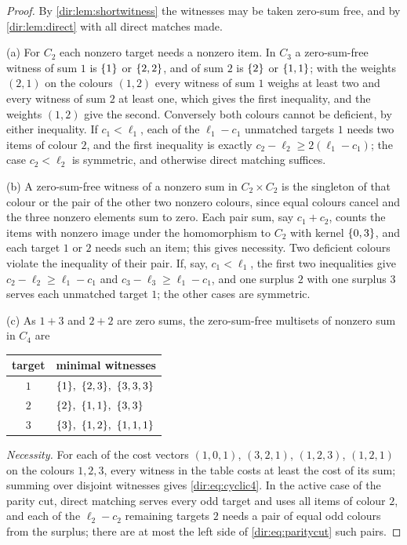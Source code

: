 \begin{proof}
By \cref{dir:lem:shortwitness} the witnesses may be taken zero-sum free, and by \cref{dir:lem:direct} with
all direct matches made.

(a) For $C_2$ each nonzero target needs a nonzero item. In $C_3$ a zero-sum-free witness of sum $1$ is
$\{1\}$ or $\{2,2\}$, and of sum $2$ is $\{2\}$ or $\{1,1\}$; with the weights $(2,1)$ on the colours
$(1,2)$ every witness of sum $1$ weighs at least two and every witness of sum $2$ at least one, which gives
the first inequality, and the weights $(1,2)$ give the second. Conversely both colours cannot be deficient,
by either inequality. If $c_1<\ell_1$, each of the $\ell_1-c_1$ unmatched targets $1$ needs two items of
colour $2$, and the first inequality is exactly $c_2-\ell_2\ge2(\ell_1-c_1)$; the case $c_2<\ell_2$ is
symmetric, and otherwise direct matching suffices.

(b) A zero-sum-free witness of a nonzero sum in $C_2\times C_2$ is the singleton of that colour or the pair of
the other two nonzero colours, since equal colours cancel and the three nonzero elements sum to zero. Each
pair sum, say $c_1+c_2$, counts the items with nonzero image under the homomorphism to $C_2$ with kernel
$\{0,3\}$, and each target $1$ or $2$ needs such an item; this gives necessity. Two deficient colours
violate the inequality of their pair. If, say, $c_1<\ell_1$, the first two inequalities give
$c_2-\ell_2\ge\ell_1-c_1$ and $c_3-\ell_3\ge\ell_1-c_1$, and one surplus $2$ with one surplus $3$ serves each
unmatched target $1$; the other cases are symmetric.

(c) As $1+3$ and $2+2$ are zero sums, the zero-sum-free multisets of nonzero sum in $C_4$ are
\begin{center}\small
\begin{tabular}{@{}cl@{}}
\toprule
target & minimal witnesses\\
\midrule
$1$ & $\set1,\ \set{2,3},\ \set{3,3,3}$\\
$2$ & $\set2,\ \set{1,1},\ \set{3,3}$\\
$3$ & $\set3,\ \set{1,2},\ \set{1,1,1}$\\
\bottomrule
\end{tabular}
\end{center}
\emph{Necessity.} For each of the cost vectors $(1,0,1)$, $(3,2,1)$, $(1,2,3)$, $(1,2,1)$ on the colours
$1,2,3$, every witness in the table costs at least the cost of its sum; summing over disjoint witnesses
gives \eqref{dir:eq:cyclic4}. In the active case of the parity cut, direct matching serves every odd target
and uses all items of colour $2$, and each of the $\ell_2-c_2$ remaining targets $2$ needs a pair of equal odd
colours from the surplus; there are at most the left side of \eqref{dir:eq:paritycut} such pairs.


\end{proof}
